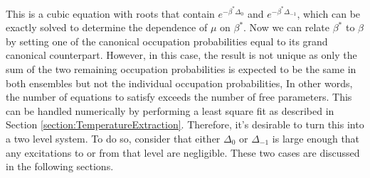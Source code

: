 This is a cubic equation with roots that contain $e^{-\beta^*\Delta_0}$ and $e^{-\beta^*\Delta_{-1}}$, which can be exactly solved to determine the dependence of $\mu$ on $\beta^*$. Now we can relate $\beta^*$ to $\beta$ by setting one of the canonical occupation probabilities equal to its grand canonical counterpart. However, in this case, the result is not unique as only the sum of the two remaining occupation probabilities is expected to be the same in both ensembles but not the individual occupation probabilities, In other words, the number of equations to satisfy exceeds the number of free parameters.
This can  be handled numerically by performing a least square fit as described in Section \ref{section:TemperatureExtraction}. %
Therefore, it's desirable to turn this into a two level system. To do so, consider that either $\Delta_0$ or $\Delta_{-1}$ is large enough that any excitations to or from that level are negligible. These two cases are discussed in the following sections. 

